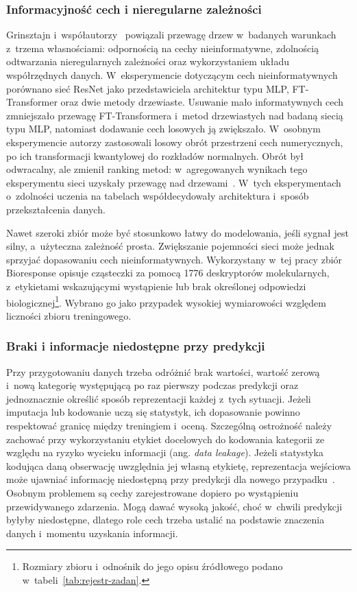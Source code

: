 \subsubsection{Informacyjność cech i nieregularne zależności}

Grinsztajn i~współautorzy~\cite{grinsztajn2022trees} powiązali przewagę drzew w~badanych warunkach z~trzema własnościami: odpornością na cechy nieinformatywne, zdolnością odtwarzania nieregularnych zależności oraz wykorzystaniem układu współrzędnych danych. W~eksperymencie dotyczącym cech nieinformatywnych porównano sieć ResNet jako przedstawiciela architektur typu MLP, FT-Transformer oraz dwie metody drzewiaste. Usuwanie mało informatywnych cech zmniejszało przewagę FT-Transformera i~metod drzewiastych nad badaną siecią typu MLP, natomiast dodawanie cech losowych ją zwiększało. W~osobnym eksperymencie autorzy zastosowali losowy obrót przestrzeni cech numerycznych, po ich transformacji kwantylowej do rozkładów normalnych. Obrót był odwracalny, ale zmienił ranking metod: w~agregowanych wynikach tego eksperymentu sieci uzyskały przewagę nad drzewami~\cite{grinsztajn2022trees}. W~tych eksperymentach o~zdolności uczenia na tabelach współdecydowały architektura i~sposób przekształcenia danych.

Nawet szeroki zbiór może być stosunkowo łatwy do modelowania, jeśli sygnał jest silny, a~użyteczna zależność prosta. Zwiększanie pojemności sieci może jednak sprzyjać dopasowaniu cech nieinformatywnych. Wykorzystany w~tej pracy zbiór Bioresponse opisuje cząsteczki za pomocą 1776 deskryptorów molekularnych, z~etykietami wskazującymi wystąpienie lub brak określonej odpowiedzi biologicznej\footnote{Rozmiary zbioru i~odnośnik do jego opisu źródłowego podano w~tabeli~\ref{tab:rejestr-zadan}.}. Wybrano go jako przypadek wysokiej wymiarowości względem liczności zbioru treningowego.

\subsubsection{Braki i informacje niedostępne przy predykcji}

Przy przygotowaniu danych trzeba odróżnić brak wartości, wartość zerową i~nową kategorię występującą po raz pierwszy podczas predykcji oraz jednoznacznie określić sposób reprezentacji każdej z~tych sytuacji. Jeżeli imputacja lub kodowanie uczą się statystyk, ich dopasowanie powinno respektować granicę między treningiem i~oceną. Szczególną ostrożność należy zachować przy wykorzystaniu etykiet docelowych do kodowania kategorii ze względu na ryzyko wycieku informacji (ang. \textit{data leakage}). Jeżeli statystyka kodująca daną obserwację uwzględnia jej własną etykietę, reprezentacja wejściowa może ujawniać informację niedostępną przy predykcji dla nowego przypadku~\cite{prokhorenkova2018catboost}. Osobnym problemem są cechy zarejestrowane dopiero po wystąpieniu przewidywanego zdarzenia. Mogą dawać wysoką jakość, choć w~chwili predykcji byłyby niedostępne, dlatego role cech trzeba ustalić na podstawie znaczenia danych i~momentu uzyskania informacji.

